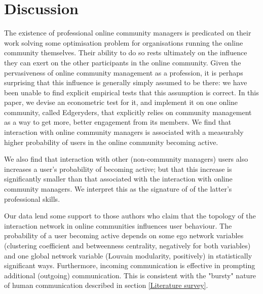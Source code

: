 \section{Discussion}

The existence of professional online community managers is predicated on their work solving some optimisation problem for organisations running the online community themselves. Their ability to do so rests ultimately on the influence they can exert on the other participants in the online community. Given the pervasiveness of online community management as a profession, it is perhaps surprising that this influence is generally simply assumed to be there: we have been unable to find explicit empirical tests that this assumption is correct. In this paper, we devise an econometric test for it, and implement it on one online community, called Edgeryders, that explicitly relies on community management as a way to get more, better engagement from its members. We find that interaction with online community managers is associated with a measurably higher probability of users in the online community becoming active. 

We also find that interaction with other (non-community managers) users also increases a user's probability of becoming active; but that this increase is significantly smaller than that associated with the interaction with online community managers. We interpret this as the signature of of the latter's professional skills. 

Our data lend some support to those authors who claim that the topology of the interaction network in online communities influences user behaviour. The probability of a user becoming active depends on some ego network variables (clustering coefficient and betweenness centrality, negatively for both variables) and one global network variable (Louvain modularity, positively) in statistically significant ways. Furthermore, incoming communication is effective in prompting additional (outgoing) communication. This is consistent with the "bursty" nature of human communication described in section \ref{Literature survey}.

